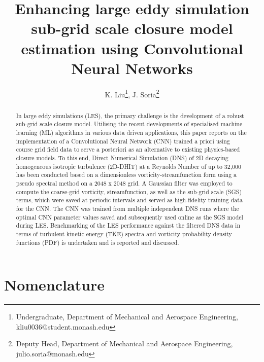 \documentclass[conf]{new-aiaa}
\title{Enhancing large eddy simulation sub-grid scale closure model estimation using Convolutional Neural Networks}
\author{K. Liu\footnote{Undergraduate, Department of Mechanical and Aerospace Engineering, kliu0036@student.monash.edu}, J. Soria\footnote{Deputy Head, Department of Mechanical and Aerospace Engineering, julio.soria@monash.edu}}
\affil{Monash University, Melbourne, Victoria, 3800, Australia}
\begin{document}
\maketitle

\begin{abstract}
    In large eddy simulations (LES), the primary challenge is the development of a robust sub-grid scale closure model. Utilising the recent developments of specialised machine learning (ML) algorithms in various data driven applications, this paper reports on the implementation of a Convolutional Neural Network (CNN) trained a priori using course grid field data to serve a posteriori as an alternative to existing physics-based closure models. To this end, Direct Numerical Simulation (DNS) of 2D decaying homogeneous isotropic turbulence (2D-DHIT) at a Reynolds Number of up to 32,000 has been conducted based on a dimensionless vorticity-streamfunction form using a pseudo spectral method on a 2048 x 2048 grid. A Gaussian filter was employed to compute the coarse-grid vorticity, streamfunction, as well as the sub-grid scale (SGS) terms, which were saved at periodic intervals and served as high-fidelity training data for the CNN. The CNN was trained from multiple independent DNS runs where the optimal CNN parameter values saved and subsequently used online as the SGS model during LES. Benchmarking of the LES performance against the filtered DNS data in terms of turbulent kinetic energy (TKE) spectra and vorticity probability density functions (PDF) is undertaken and is reported and discussed.
\end{abstract}

\section*{Nomenclature}
\end{document}
